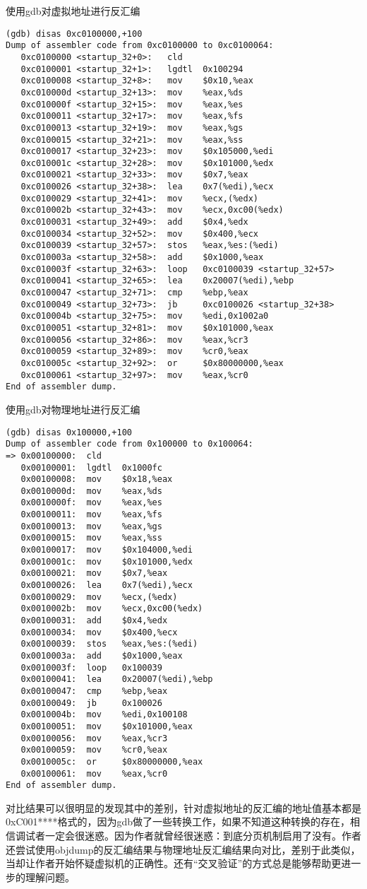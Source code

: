 使用gdb对虚拟地址进行反汇编
\begin{lstlisting}
(gdb) disas 0xc0100000,+100
Dump of assembler code from 0xc0100000 to 0xc0100064:
   0xc0100000 <startup_32+0>:   cld
   0xc0100001 <startup_32+1>:   lgdtl  0x100294
   0xc0100008 <startup_32+8>:   mov    $0x10,%eax
   0xc010000d <startup_32+13>:  mov    %eax,%ds
   0xc010000f <startup_32+15>:  mov    %eax,%es
   0xc0100011 <startup_32+17>:  mov    %eax,%fs
   0xc0100013 <startup_32+19>:  mov    %eax,%gs
   0xc0100015 <startup_32+21>:  mov    %eax,%ss
   0xc0100017 <startup_32+23>:  mov    $0x105000,%edi
   0xc010001c <startup_32+28>:  mov    $0x101000,%edx
   0xc0100021 <startup_32+33>:  mov    $0x7,%eax
   0xc0100026 <startup_32+38>:  lea    0x7(%edi),%ecx
   0xc0100029 <startup_32+41>:  mov    %ecx,(%edx)
   0xc010002b <startup_32+43>:  mov    %ecx,0xc00(%edx)
   0xc0100031 <startup_32+49>:  add    $0x4,%edx
   0xc0100034 <startup_32+52>:  mov    $0x400,%ecx
   0xc0100039 <startup_32+57>:  stos   %eax,%es:(%edi)
   0xc010003a <startup_32+58>:  add    $0x1000,%eax
   0xc010003f <startup_32+63>:  loop   0xc0100039 <startup_32+57>
   0xc0100041 <startup_32+65>:  lea    0x20007(%edi),%ebp
   0xc0100047 <startup_32+71>:  cmp    %ebp,%eax
   0xc0100049 <startup_32+73>:  jb     0xc0100026 <startup_32+38>
   0xc010004b <startup_32+75>:  mov    %edi,0x1002a0
   0xc0100051 <startup_32+81>:  mov    $0x101000,%eax
   0xc0100056 <startup_32+86>:  mov    %eax,%cr3
   0xc0100059 <startup_32+89>:  mov    %cr0,%eax
   0xc010005c <startup_32+92>:  or     $0x80000000,%eax
   0xc0100061 <startup_32+97>:  mov    %eax,%cr0
End of assembler dump.
\end{lstlisting}


使用gdb对物理地址进行反汇编
\begin{lstlisting}
(gdb) disas 0x100000,+100
Dump of assembler code from 0x100000 to 0x100064:
=> 0x00100000:  cld
   0x00100001:  lgdtl  0x1000fc
   0x00100008:  mov    $0x18,%eax
   0x0010000d:  mov    %eax,%ds
   0x0010000f:  mov    %eax,%es
   0x00100011:  mov    %eax,%fs
   0x00100013:  mov    %eax,%gs
   0x00100015:  mov    %eax,%ss
   0x00100017:  mov    $0x104000,%edi
   0x0010001c:  mov    $0x101000,%edx
   0x00100021:  mov    $0x7,%eax
   0x00100026:  lea    0x7(%edi),%ecx
   0x00100029:  mov    %ecx,(%edx)
   0x0010002b:  mov    %ecx,0xc00(%edx)
   0x00100031:  add    $0x4,%edx
   0x00100034:  mov    $0x400,%ecx
   0x00100039:  stos   %eax,%es:(%edi)
   0x0010003a:  add    $0x1000,%eax
   0x0010003f:  loop   0x100039
   0x00100041:  lea    0x20007(%edi),%ebp
   0x00100047:  cmp    %ebp,%eax
   0x00100049:  jb     0x100026
   0x0010004b:  mov    %edi,0x100108
   0x00100051:  mov    $0x101000,%eax
   0x00100056:  mov    %eax,%cr3
   0x00100059:  mov    %cr0,%eax
   0x0010005c:  or     $0x80000000,%eax
   0x00100061:  mov    %eax,%cr0
End of assembler dump.
\end{lstlisting}

对比结果可以很明显的发现其中的差别，针对虚拟地址的反汇编的地址值基本都是0xC001****格式的，因为gdb做了一些转换工作，如果不知道这种转换的存在，相信调试者一定会很迷惑。因为作者就曾经很迷惑：到底分页机制启用了没有。作者还尝试使用objdump的反汇编结果与物理地址反汇编结果向对比，差别于此类似，当却让作者开始怀疑虚拟机的正确性。还有“交叉验证”的方式总是能够帮助更进一步的理解问题。
